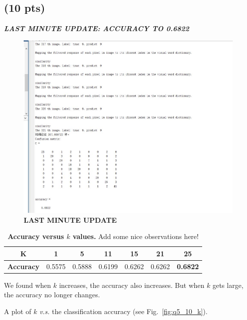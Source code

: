 \documentclass[12pt]{article}
\begin{document}
\subsection{(10 pts)}
\textbf{\emph{LAST MINUTE UPDATE: ACCURACY TO 0.6822}}
\begin{figure}[ht!]
  \caption{\bf LAST MINUTE UPDATE}
  \centering \includegraphics[width=0.9\linewidth]{./figures/k=25_sim.jpg} 
\end{figure}

\begin{table}[h!]
  \centering

  \begin{tabular}{|c|c|c|c|c|c|c|}
    \hline
    {\bf K} & {\bf 1} & {\bf 5} & {\bf 11} & {\bf 15} & {\bf 21} & {\bf 25} \\
    \hline
    {\bf Accuracy} & 0.5575 & 0.5888 & 0.6199 & 0.6262 & 0.6262 & {\bf 0.6822}\\
    \hline
  \end{tabular}
  \caption{{\bf Accuracy versus $k$ values.} Add some nice observations here!}
\end{table}

We found when $k$ increases, the accuracy also increases. But when $k$ gets large, the accuracy no longer changes.

A plot of $k$ \textit{v.s.} the classification accuracy (see Fig.~\ref{fig:q5_10_k}).
\end{document}
